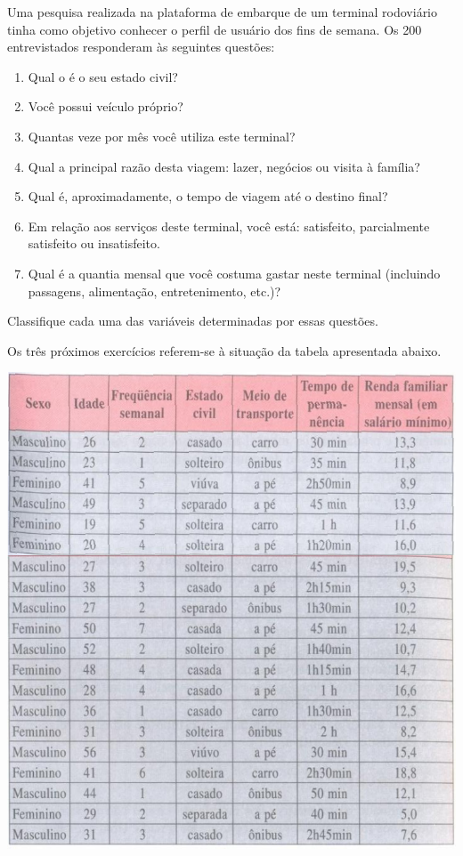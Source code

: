 	\item Uma pesquisa realizada na plataforma de embarque de um terminal rodoviário tinha como objetivo conhecer o perfil de usuário dos fins de semana. Os 200 entrevistados responderam às seguintes questões:
	\begin{enumerate}[1 -]
		\item Qual o é o seu estado civil?
		\item Você possui veículo próprio?
		\item Quantas veze por mês você utiliza este terminal?
		\item Qual a principal razão desta viagem: lazer, negócios ou visita à família?
		\item Qual é, aproximadamente, o tempo de viagem até o destino final?
		\item Em relação aos serviços deste terminal, você está: satisfeito, parcialmente satisfeito ou insatisfeito.
		\item Qual é a quantia mensal que você costuma gastar neste terminal (incluindo passagens, alimentação, entretenimento, etc.)?
	\end{enumerate}
	Classifique cada uma das variáveis determinadas por essas questões.
	
	Os três próximos exercícios referem-se à situação da tabela apresentada abaixo.
	\begin{center}
		\includegraphics[scale=0.5]{figuras/fig104.png}	
	\end{center}
	

